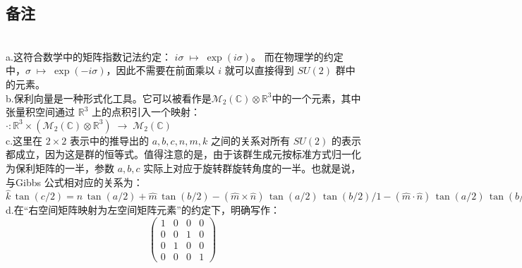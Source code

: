 \subsection{备注}\\
a.这符合数学中的矩阵指数记法约定：
  $i\sigma \;\mapsto\; \exp(i\sigma)$。
  而在物理学的约定中，$\sigma \;\mapsto\; \exp(-i\sigma)$，因此不需要在前面乘以 $i$ 就可以直接得到 $SU(2)$ 群中的元素。\\
b.保利向量是一种形式化工具。它可以被看作是$\mathcal{M}_2(\mathbb{C}) \otimes \mathbb{R}^3$中的一个元素，其中张量积空间通过 $\mathbb{R}^3$ 上的点积引入一个映射：$\cdot : \mathbb{R}^3 \times (\mathcal{M}_2(\mathbb{C}) \otimes \mathbb{R}^3) \;\longrightarrow\; \mathcal{M}_2(\mathbb{C})$\\
c.这里在 $2 \times 2$ 表示中的推导出的 $a, b, c, n, m, k$ 之间的关系对所有 $SU(2)$ 的表示都成立，因为这是群的恒等式。值得注意的是，由于该群生成元按标准方式归一化为保利矩阵的一半，参数 $a, b, c$ 实际上对应于旋转群旋转角度的一半。也就是说，与Gibbs 公式相对应的关系为：$\hat{k}\,\tan(c/2) = \hat{n}\,\tan(a/2) + \hat{m}\,\tan(b/2)-(\hat{m} \times \hat{n})\,\tan(a/2)\,\tan(b/2)/1 - (\hat{m} \cdot \hat{n})\,\tan(a/2)\,\tan(b/2)$\\
d.在“右空间矩阵映射为左空间矩阵元素”的约定下，明确写作：
  $$
  \begin{pmatrix}
  1 & 0 & 0 & 0\\
  0 & 0 & 1 & 0\\
  0 & 1 & 0 & 0\\
  0 & 0 & 0 & 1
  \end{pmatrix}~
  $$
